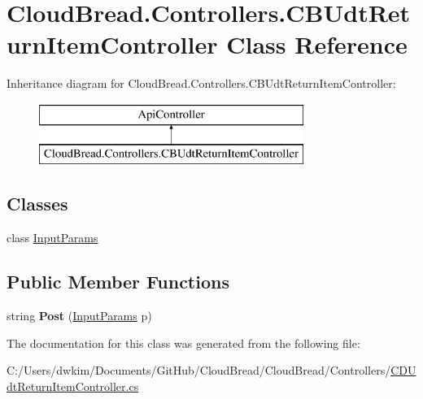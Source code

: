 \hypertarget{a00061}{}\section{Cloud\+Bread.\+Controllers.\+C\+B\+Udt\+Return\+Item\+Controller Class Reference}
\label{a00061}
Inheritance diagram for Cloud\+Bread.\+Controllers.\+C\+B\+Udt\+Return\+Item\+Controller\+:\begin{figure}[H]
\begin{center}
\leavevmode
\includegraphics[height=2.000000cm]{a00061}
\end{center}
\end{figure}
\subsection*{Classes}
\begin{DoxyCompactItemize}
\item 
class \hyperlink{a00118}{Input\+Params}
\end{DoxyCompactItemize}
\subsection*{Public Member Functions}
\begin{DoxyCompactItemize}
\item 
string {\bfseries Post} (\hyperlink{a00118}{Input\+Params} p)\hypertarget{a00061_a87a08b50ec73fd4f516a143dbd8e9ec0}{}\label{a00061_a87a08b50ec73fd4f516a143dbd8e9ec0}

\end{DoxyCompactItemize}


The documentation for this class was generated from the following file\+:\begin{DoxyCompactItemize}
\item 
C\+:/\+Users/dwkim/\+Documents/\+Git\+Hub/\+Cloud\+Bread/\+Cloud\+Bread/\+Controllers/\hyperlink{a00234}{C\+D\+Udt\+Return\+Item\+Controller.\+cs}\end{DoxyCompactItemize}
